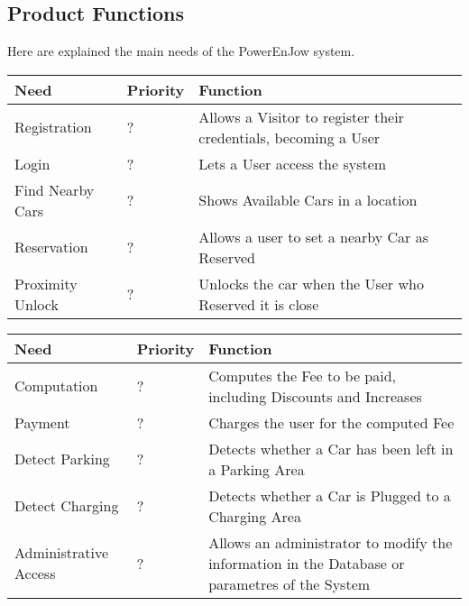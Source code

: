 \documentclass[12pt]{article}
\begin{document}
\subsection{Product Functions}
Here are explained the main needs of the PowerEnJow system.
\begin{center}
  \begin{tabular}{|p{}|p{}|p{}|}
    \hline
    \textbf{Need} & \textbf{Priority} & \textbf{Function} \\ \hline
    Registration & ? & Allows a Visitor to register their credentials, becoming a User \\ \hline
    Login & ? & Lets a User access the system \\ \hline
    Find Nearby Cars & ? & Shows Available Cars in a location \\ \hline
    Reservation & ? & Allows a user to set a nearby Car as Reserved \\ \hline
    Proximity Unlock & ? & Unlocks the car when the User who Reserved it is close \\ \hline
  \end{tabular}
\end{center}
\begin{center}
  \begin{tabular}{|p{}|p{}|p{}|}
    \hline
    \textbf{Need} & \textbf{Priority} & \textbf{Function} \\ \hline
    Computation & ? & Computes the Fee to be paid, including Discounts and Increases \\ \hline
    Payment & ? & Charges the user for the computed Fee \\ \hline
    Detect Parking & ? & Detects whether a Car has been left in a Parking Area \\ \hline
    Detect Charging & ? & Detects whether a Car is Plugged to a Charging Area \\ \hline
    Administrative Access & ? & Allows an administrator to modify the information in the Database or parametres of the System \\ \hline
  \end{tabular}
\end{center}
\end{document}
